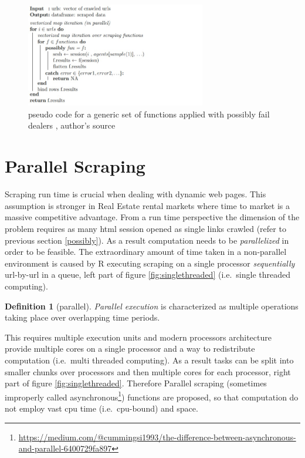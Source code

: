 \documentclass[
  12pt,
  a4paper,
  oneside]{book}
\DeclareRobustCommand{\href}[2]{#2\footnote{\url{#1}}}
\theoremstyle{definition}
\newtheorem{definition}{Definition}[chapter]
\theoremstyle{definition}
\theoremstyle{definition}
\theoremstyle{remark}
\begin{document}
\begin{figure}
\centering
\includegraphics[width=0.7\textwidth,height=\textheight]{images/pseudocode_latex/pseudocode_possibly.jpg}
\caption{\label{fig:pseudocode2}pseudo code for a generic set of functions applied with possibly fail dealers , author's source}
\end{figure}

\hypertarget{parallelscraping}{%
\section{Parallel Scraping}\label{parallelscraping}}

Scraping run time is crucial when dealing with dynamic web pages. This assumption is stronger in Real Estate rental markets where time to market is a massive competitive advantage.
From a run time perspective the dimension of the problem requires as many html session opened as single links crawled (refer to previous section \ref{possibly}). As a result computation needs to be \emph{parallelized} in order to be feasible.
The extraordinary amount of time taken in a non-parallel environment is caused by R executing scraping on a single processor \emph{sequentially} url-by-url in a queue, left part of figure \ref{fig:singlethreaded} (i.e.~single threaded computing).

\begin{definition}[parallel]
\protect\hypertarget{def:parallel}{}{\label{def:parallel} {} }\emph{Parallel execution} is characterized as multiple operations taking place over overlapping time periods. \citep{eddelbuettel2020parallel}
\end{definition}

This requires multiple execution units and modern processors architecture provide multiple cores on a single processor and a way to redistribute computation (i.e.~multi threaded computing). As a result tasks can be split into smaller chunks over processors and then multiple cores for each processor, right part of figure \ref{fig:singlethreaded}.
Therefore Parallel scraping (sometimes improperly called \href{https://medium.com/@cummingsi1993/the-difference-between-asynchronous-and-parallel-6400729fa897}{asynchronous}) functions are proposed, so that computation do not employ vast cpu time (i.e.~cpu-bound) and space.
\end{document}
